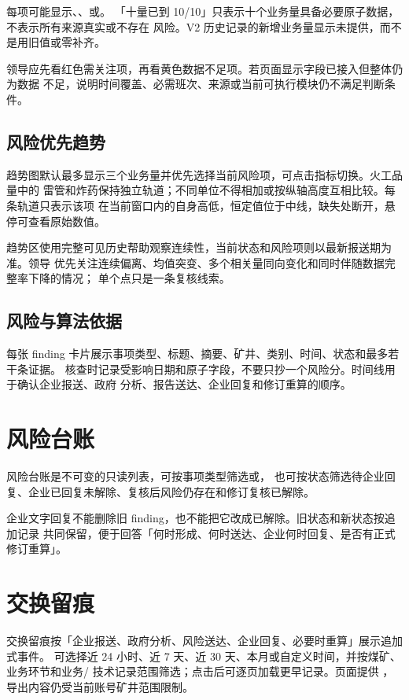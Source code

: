 \documentclass[UTF8,openany,zihao=-4,fontset=none]{ctexbook}
\begin{document}
每项可能显示、、或。
「十量已到 10/10」只表示十个业务量具备必要原子数据，不表示所有来源真实或不存在
风险。V2 历史记录的新增业务量显示未提供，而不是用旧值或零补齐。

领导应先看红色需关注项，再看黄色数据不足项。若页面显示字段已接入但整体仍为数据
不足，说明时间覆盖、必需班次、来源或当前可执行模块仍不满足判断条件。

\subsection{风险优先趋势}

趋势图默认最多显示三个业务量并优先选择当前风险项，可点击指标切换。火工品量中的
雷管和炸药保持独立轨道；不同单位不得相加或按纵轴高度互相比较。每条轨道只表示该项
在当前窗口内的自身高低，恒定值位于中线，缺失处断开，悬停可查看原始数值。

趋势区使用完整可见历史帮助观察连续性，当前状态和风险项则以最新报送期为准。领导
优先关注连续偏离、均值突变、多个相关量同向变化和同时伴随数据完整率下降的情况；
单个点只是一条复核线索。

\subsection{风险与算法依据}

每张 finding 卡片展示事项类型、标题、摘要、矿井、类别、时间、状态和最多若干条证据。
核查时记录受影响日期和原子字段，不要只抄一个风险分。时间线用于确认企业报送、政府
分析、报告送达、企业回复和修订重算的顺序。

\section{风险台账}

风险台账是不可变的只读列表，可按事项类型筛选或，
也可按状态筛选待企业回复、企业已回复未解除、复核后风险仍存在和修订复核已解除。

企业文字回复不能删除旧 finding，也不能把它改成已解除。旧状态和新状态按追加记录
共同保留，便于回答「何时形成、何时送达、企业何时回复、是否有正式修订重算」。

\section{交换留痕}

交换留痕按「企业报送、政府分析、风险送达、企业回复、必要时重算」展示追加式事件。
可选择近 24 小时、近 7 天、近 30 天、本月或自定义时间，并按煤矿、业务环节和业务/
技术记录范围筛选；点击后可逐页加载更早记录。页面提供
，导出内容仍受当前账号矿井范围限制。
\end{document}
